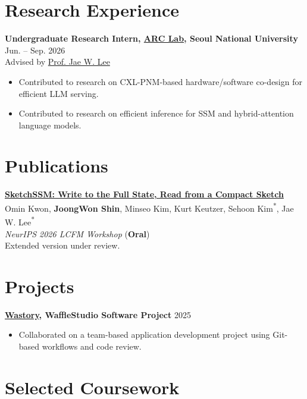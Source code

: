 \documentclass[10pt,a4paper]{article}
\newcommand{\cvitem}[2]{
  \textbf{#1} \hfill #2
}
\begin{document}
\section*{Research Experience}

\cvitem{Undergraduate Research Intern, \href{https://arc.snu.ac.kr/}{ARC Lab}, Seoul National University}{Jun. -- Sep. 2026} \\
Advised by \href{https://iamjaelee.github.io/www/}{Prof. Jae W. Lee}
\begin{itemize}[leftmargin=1.2em, itemsep=2pt]
    \item Contributed to research on CXL-PNM-based hardware/software co-design for efficient LLM serving.
    \item Contributed to research on efficient inference for SSM and hybrid-attention language models.
\end{itemize}

\section*{Publications}

\textbf{\href{https://arxiv.org/abs/2609.33051}{SketchSSM: Write to the Full State, Read from a Compact Sketch}} \\
Omin Kwon, \textbf{JoongWon Shin}, Minseo Kim, Kurt Keutzer, Sehoon Kim\textsuperscript{*}, Jae W. Lee\textsuperscript{*} \\
\textit{NeurIPS 2026 LCFM Workshop} (\textbf{Oral}) \\
Extended version under review.

\section*{Projects}

\cvitem{\href{https://github.com/wafflestudio/22-5-team5-iOS}{Wastory}, WaffleStudio Software Project}{2025}
\begin{itemize}[leftmargin=1.2em, itemsep=2pt]
    \item Collaborated on a team-based application development project using Git-based workflows and code review.
\end{itemize}

\section*{Selected Coursework}
\end{document}

